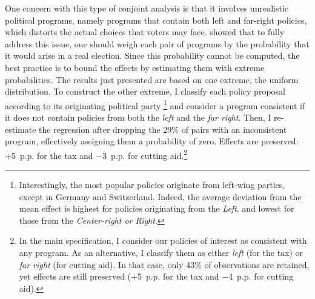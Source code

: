 \documentclass[12pt,english]{article}
\begin{document}
\begin{bibunit}
One concern with this type of conjoint analysis is that it involves unrealistic political programs, namely programs that contain both left and far-right policies, which distorts the actual choices that voters may face. \cite{de_la_cuesta_improving_2022} showed that to fully address this issue, one should weigh each pair of programs by the probability that it would arise in a real election. Since this probability cannot be computed, the best practice is to bound the effects by estimating them with extreme probabilities. The results just presented are based on one extreme, the uniform distribution. To construct the other extreme, I classify each policy proposal according to its originating political party%
\footnote{Interestingly, the most popular policies originate from left-wing parties, except in Germany and Switzerland. 
Indeed, the average deviation from the mean effect is highest for policies originating from the \textit{Left}, and lowest for those from the \textit{Center-right or Right}. 
} 
and consider a program consistent if it does not contain policies from both the \textit{left} and the \textit{far right}. Then, I re-estimate the regression after dropping the 29\% of pairs with an inconsistent program, effectively assigning them a probability of zero. Effects are preserved: +5~p.p. for the tax and $-$3~p.p. for cutting aid.\footnote{In the main specification, I consider our policies of interest as consistent with any program. As an alternative, I classify them as either \textit{left} (for the tax) or \textit{far right} (for cutting aid). In that case, only 43\% of observations are retained, yet effects are still preserved (+5~p.p. for the tax and $-$4~p.p. for cutting aid).} 

\end{bibunit}
\end{document}
